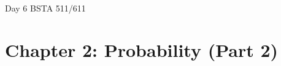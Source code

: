 \documentclass[12pt]{amsart}
\newtheorem{example}[theorem]{Example}
\begin{document}
\setcounter{section}{2}
\setcounter{subsection}{4}
\setcounter{theorem}{6}
Day 6 BSTA 511/611
{\huge  
\section*{Chapter 2: Probability (Part 2)}
}





%
%
%
%
%
%
%
%
%
%
%
%
%


\end{document}
